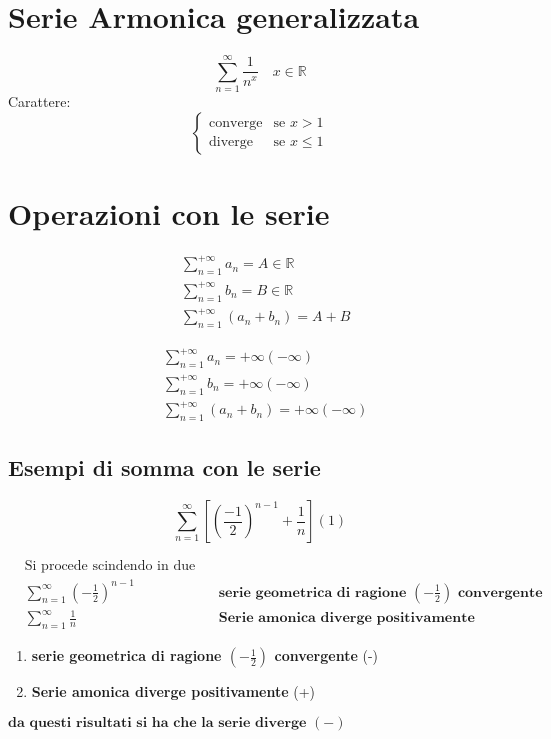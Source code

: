 \documentclass{article}
\begin{document}
\section*{Serie Armonica generalizzata}
\[
    \sum_{n=1}^{\infty} \frac{1}{n^x} \quad x \in \mathbb{R}
\]
Carattere:
\[
    \begin{cases}
        \text{converge} & \text{se } x > 1 \\
        \text{diverge} & \text{se } x \leq 1
    \end{cases}
\]

\section*{Operazioni con le serie}
\begin{align*}
    &\sum_{n=1}^{+\infty} a_n  = A \in \mathbb{R}\\
    &\sum_{n=1}^{+\infty} b_n = B \in \mathbb{R} \\
    &\sum_{n=1}^{+\infty} (a_n +b_n) = A+B
\end{align*}

\begin{align*}
    &\sum_{n=1}^{+\infty} a_n  = +\infty (-\infty)\\
    &\sum_{n=1}^{+\infty} b_n = +\infty (-\infty) \\
    &\sum_{n=1}^{+\infty} (a_n +b_n) = +\infty (-\infty)
\end{align*}

\subsection*{Esempi di somma con le serie}
\[
    \sum_{n=1}^{\infty} \left[\left( \frac{-1}{2}\right)^{n-1} + \frac{1}{n}\right] (1)
\]

\begin{align*}
        &\text{Si procede scindendo in due la serie} \\
        &\sum_{n=1}^{\infty} \left(-\frac{1}{2} \right)^{n-1}  &\textbf{serie geometrica di ragione $\left( -\frac{1}{2}\right)$ convergente}\\  
        &\sum_{n=1}^{\infty} \frac{1}{n} &\textbf{Serie amonica diverge positivamente} 
\end{align*}
    
\begin{enumerate}
        \item \textbf{serie geometrica di ragione $\left( -\frac{1}{2}\right)$ convergente} (-)
        \item \textbf{Serie amonica diverge positivamente} (+)
\end{enumerate}
    $\textbf{da questi risultati si ha che la serie diverge }(-)$
\end{document}
